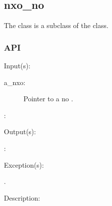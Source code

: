 %
%
%
%
%              

\subsection{nxo\_no}
\label{nxo_no}

The  class is a subclass of the  class.

\subsubsection{API}
\begin{capi}
\label{nxo_no_}
	\begin{capilist}
	\item[Input(s): ]
		\begin{description}\item[]
		\item[a\_nxo: ]
			Pointer to a no .
		\item[: ]
		\end{description}
	\item[Output(s): ]
		\begin{description}\item[]
		\item[: ]
		\end{description}
	\item[Exception(s): ]
		\begin{description}\item[]
		\item[.]
		\end{description}
	\item[Description: ]
	\end{capilist}
\end{capi}
